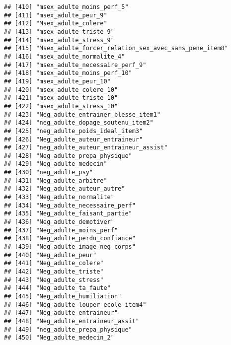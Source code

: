 \documentclass[
]{article}
\begin{document}
\begin{verbatim}
## [410] "msex_adulte_moins_perf_5"                            
## [411] "msex_adulte_peur_9"                                  
## [412] "Msex_adulte_colere"                                  
## [413] "msex_adulte_triste_9"                                
## [414] "msex_adulte_stress_9"                                
## [415] "Msex_adulte_forcer_relation_sex_avec_sans_pene_item8"
## [416] "msex_adulte_normalite_4"                             
## [417] "msex_adulte_necessaire_perf_9"                       
## [418] "msex_adulte_moins_perf_10"                           
## [419] "msex_adulte_peur_10"                                 
## [420] "msex_adulte_colere_10"                               
## [421] "msex_adulte_triste_10"                               
## [422] "msex_adulte_stress_10"                               
## [423] "Neg_adulte_entrainer_blesse_item1"                   
## [424] "neg_adulte_dopage_soutenu_item2"                     
## [425] "neg_adulte_poids_ideal_item3"                        
## [426] "Neg_adulte_auteur_entraineur"                        
## [427] "neg_adulte_auteur_entraineur_assist"                 
## [428] "Neg_adulte_prepa_physique"                           
## [429] "Neg_adulte_medecin"                                  
## [430] "neg_adulte_psy"                                      
## [431] "Neg_adulte_arbitre"                                  
## [432] "Neg_adulte_auteur_autre"                             
## [433] "Neg_adulte_normalite"                                
## [434] "Neg_adulte_necessaire_perf"                          
## [435] "Neg_adulte_faisant_partie"                           
## [436] "Neg_adulte_demotiver"                                
## [437] "Neg_adulte_moins_perf"                               
## [438] "Neg_adulte_perdu_confiance"                          
## [439] "Neg_adulte_image_neg_corps"                          
## [440] "Neg_adulte_peur"                                     
## [441] "Neg_adulte_colere"                                   
## [442] "Neg_adulte_triste"                                   
## [443] "Neg_adulte_stress"                                   
## [444] "Neg_adulte_ta_faute"                                 
## [445] "Neg_adulte_humiliation"                              
## [446] "Neg_adulte_louper_ecole_item4"                       
## [447] "Neg_adulte_entraineur"                               
## [448] "Neg_adulte_entraineur_assit"                         
## [449] "neg_adulte_prepa_physique"                           
## [450] "Neg_adulte_medecin_2"                                

\end{verbatim}
\end{document}
